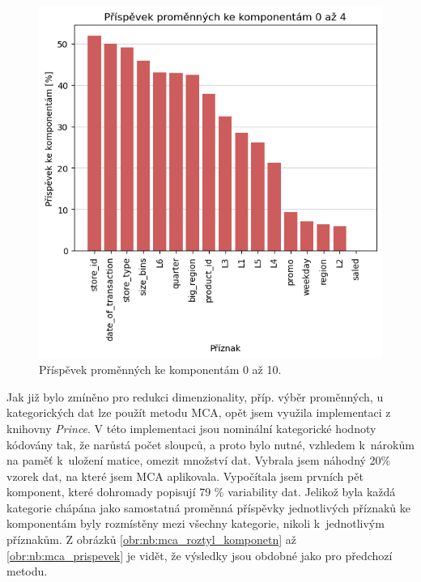\begin{figure}[h!]
    \centering
    \includegraphics[width=.8\textwidth]{obrazky/pripravadat/pca-prispevky.png}
    \caption{Příspěvek proměnných ke komponentám 0 až 10.}
    \label{obr:nb:pca_prispevek}
\end{figure}
    
Jak již bylo zmíněno pro redukci dimenzionality, příp. výběr proměnných, u kategorických dat lze použít metodu MCA, opět jsem využila implementaci z knihovny \emph{Prince}. 
V této implementaci jsou nominální kategorické hodnoty kódovány tak, že narůstá počet sloupců, a proto bylo nutné, vzhledem k~nárokům na paměť k~uložení matice, omezit množství dat. 
Vybrala jsem náhodný 20\% vzorek dat, na které jsem MCA aplikovala. Vypočítala jsem prvních pět komponent, které dohromady popisují 79 \% variability dat. Jelikož byla každá kategorie chápána jako samostatná proměnná příspěvky jednotlivých příznaků ke komponentám byly rozmístěny mezi všechny kategorie, nikoli k~jednotlivým příznakům. 
Z obrázků \ref*{obr:nb:mca_roztyl_komponetn} až \ref*{obr:nb:mca_prispevek} je vidět, že výsledky jsou obdobné jako pro předchozí metodu.

